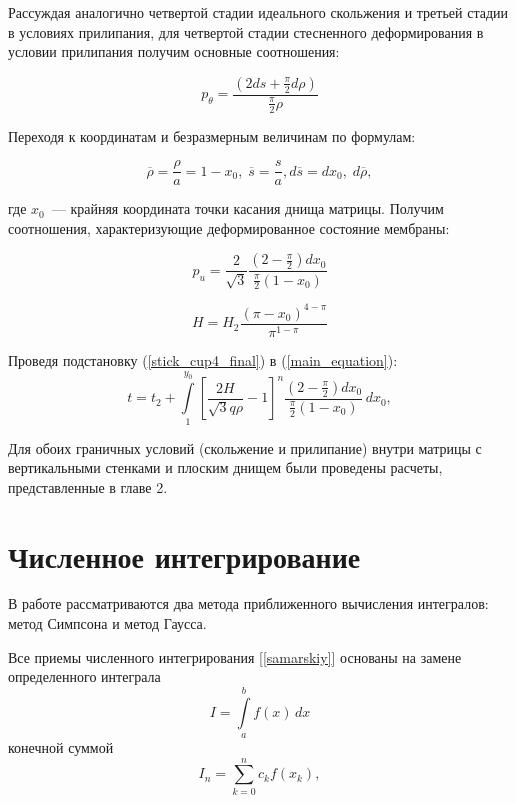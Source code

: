 Рассуждая аналогично четвертой стадии идеального скольжения и третьей стадии в условиях прилипания,  для четвертой стадии 
стесненного деформирования в условии прилипания получим основные соотношения:

 \begin{equation}
   p_\theta = \dfrac{(2ds+ \frac{\pi}{2}d\rho)}{\frac{\pi}{2}\rho}
 \end{equation}

Переходя к координатам и безразмерным величинам по формулам:

\begin{equation}
\overline{\rho} = \dfrac{\rho}{a} = 1-x_0, \; \overline{s} = \dfrac{s}{a}, d\overline{s} = dx_0, \; d\overline{\rho},
\end{equation}

где $x_0$~--- крайняя координата точки касания днища матрицы. Получим соотношения, характеризующие деформированное состояние мембраны:

 \begin{equation}
   p_u = \dfrac{2}{\sqrt 3}\dfrac{(2-\frac{\pi}{2}) dx_0}{\frac{\pi}{2} (1-x_0)}
   \label{stick_cup4_final}
 \end{equation}
   
 \begin{equation}
   H = H_2 \dfrac{(\pi-x_0)^{4-\pi}}{\pi^{1-\pi}}
 \end{equation}
   
   Проведя подстановку (\ref{stick_cup4_final}) в (\ref{main_equation}):
 \begin{equation}
   t = t_2 + \int\limits^{y_0}_1 \left[ \dfrac{2H}{\sqrt3 q \rho} -1\right]^n\dfrac{(2-\frac{\pi}{2}) dx_0}{\frac{\pi}{2} (1-x_0)}\,dx_0,
   \end{equation}

Для обоих граничных условий (скольжение и прилипание) внутри матрицы с вертикальными стенками и плоским днищем были проведены расчеты, представленные в главе 2. 

\section{Численное интегрирование}
В работе рассматриваются два метода приближенного вычисления интегралов: метод Симпсона и метод Гаусса.

Все приемы численного интегрирования [\ref{samarskiy}] основаны на  замене определенного интеграла 
\begin{equation}
	I = \int\limits_a^b f(x)\,dx
\end{equation}
конечной суммой
\begin{equation}
	I_n = \sum\limits_{k=0}^n c_k f(x_k),
\end{equation}

